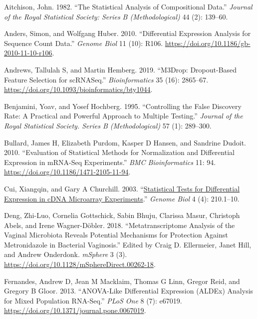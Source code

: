 \documentclass[
]{article}
\newlength{\cslhangindent}
\newlength{\cslentryspacingunit} %
\newenvironment{CSLReferences}[2] %
 {%
  \setlength{\parindent}{0pt}
  \ifodd #1
  \let\oldpar\par
  \def\par{\hangindent=\cslhangindent\oldpar}
  \fi
  \setlength{\parskip}{#2\cslentryspacingunit}
 }%
 {}
\begin{document}
\hypertarget{refs}{}
\begin{CSLReferences}{1}{0}
\leavevmode{}%
Aitchison, John. 1982. {``The Statistical Analysis of Compositional
Data.''} \emph{Journal of the Royal Statistical Society: Series B
(Methodological)} 44 (2): 139--60.

\leavevmode{}%
Anders, Simon, and Wolfgang Huber. 2010. {``Differential Expression
Analysis for Sequence Count Data.''} \emph{Genome Biol} 11 (10): R106.
\url{https://doi.org/10.1186/gb-2010-11-10-r106}.

\leavevmode{}%
Andrews, Tallulah S, and Martin Hemberg. 2019. {``M3Drop: Dropout-Based
Feature Selection for scRNASeq.''} \emph{Bioinformatics} 35 (16):
2865--67. \url{https://doi.org/10.1093/bioinformatics/bty1044}.

\leavevmode{}%
Benjamini, Yoav, and Yosef Hochberg. 1995. {``Controlling the False
Discovery Rate: A Practical and Powerful Approach to Multiple
Testing.''} \emph{Journal of the Royal Statistical Society. Series B
(Methodological)} 57 (1): 289--300.

\leavevmode{}%
Bullard, James H, Elizabeth Purdom, Kasper D Hansen, and Sandrine
Dudoit. 2010. {``Evaluation of Statistical Methods for Normalization and
Differential Expression in m{RNA-Seq} Experiments.''} \emph{BMC
Bioinformatics} 11: 94. \url{https://doi.org/10.1186/1471-2105-11-94}.

\leavevmode{}%
Cui, Xiangqin, and Gary A Churchill. 2003.
{``\href{https://www.ncbi.nlm.nih.gov/pubmed/12702200}{Statistical Tests
for Differential Expression in cDNA Microarray Experiments}.''}
\emph{Genome Biol} 4 (4): 210.1--10.

\leavevmode{}%
Deng, Zhi-Luo, Cornelia Gottschick, Sabin Bhuju, Clarissa Masur,
Christoph Abels, and Irene Wagner-Döbler. 2018. {``Metatranscriptome
Analysis of the Vaginal Microbiota Reveals Potential Mechanisms for
Protection Against Metronidazole in Bacterial Vaginosis.''} Edited by
Craig D. Ellermeier, Janet Hill, and Andrew Onderdonk. \emph{mSphere} 3
(3). \url{https://doi.org/10.1128/mSphereDirect.00262-18}.

\leavevmode{}%
Fernandes, Andrew D, Jean M Macklaim, Thomas G Linn, Gregor Reid, and
Gregory B Gloor. 2013. {``ANOVA-Like Differential Expression (ALDEx)
Analysis for Mixed Population RNA-Seq.''} \emph{PLoS One} 8 (7): e67019.
\url{https://doi.org/10.1371/journal.pone.0067019}.


\end{CSLReferences}
\end{document}
